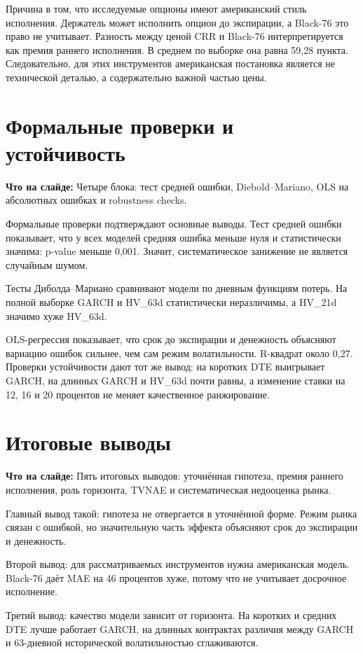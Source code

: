 \documentclass[11pt,a4paper]{article}
\newcommand{\whatsonslide}[1]{%
  \noindent\colorbox{softblue}{%
    \parbox{\dimexpr\linewidth-2\fboxsep\relax}{\textbf{Что на слайде:} #1}%
  }\par\vspace{0.2em}
}
\begin{document}
Причина в том, что исследуемые опционы имеют американский стиль исполнения. Держатель может исполнить опцион до экспирации, а Black-76 это право не учитывает. Разность между ценой CRR и Black-76 интерпретируется как премия раннего исполнения. В среднем по выборке она равна 59,28 пункта. Следовательно, для этих инструментов американская постановка является не технической деталью, а содержательно важной частью цены.

\section{Формальные проверки и устойчивость}

\whatsonslide{Четыре блока: тест средней ошибки, Diebold--Mariano, OLS на абсолютных ошибках и robustness checks.}

Формальные проверки подтверждают основные выводы. Тест средней ошибки показывает, что у всех моделей средняя ошибка меньше нуля и статистически значима: p-value меньше 0,001. Значит, систематическое занижение не является случайным шумом.

Тесты Диболда--Мариано сравнивают модели по дневным функциям потерь. На полной выборке GARCH и HV\_63d статистически неразличимы, а HV\_21d значимо хуже HV\_63d.

OLS-регрессия показывает, что срок до экспирации и денежность объясняют вариацию ошибок сильнее, чем сам режим волатильности. R-квадрат около 0,27. Проверки устойчивости дают тот же вывод: на коротких DTE выигрывает GARCH, на длинных GARCH и HV\_63d почти равны, а изменение ставки на 12, 16 и 20 процентов не меняет качественное ранжирование.

\section{Итоговые выводы}

\whatsonslide{Пять итоговых выводов: уточнённая гипотеза, премия раннего исполнения, роль горизонта, TVNAE и систематическая недооценка рынка.}

Главный вывод такой: гипотеза не отвергается в уточнённой форме. Режим рынка связан с ошибкой, но значительную часть эффекта объясняют срок до экспирации и денежность.

Второй вывод: для рассматриваемых инструментов нужна американская модель. Black-76 даёт MAE на 46 процентов хуже, потому что не учитывает досрочное исполнение.

Третий вывод: качество модели зависит от горизонта. На коротких и средних DTE лучше работает GARCH, на длинных контрактах различия между GARCH и 63-дневной исторической волатильностью сглаживаются.
\end{document}
